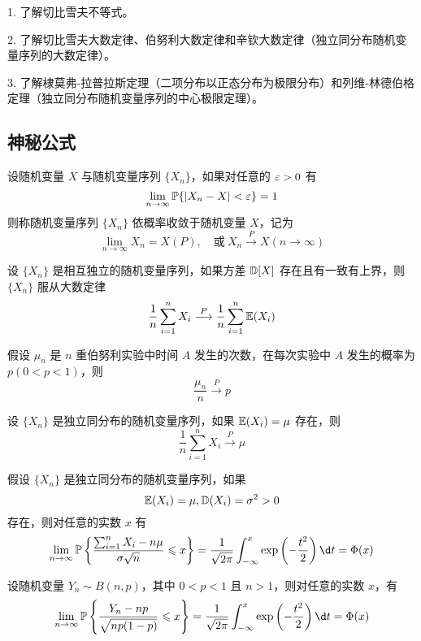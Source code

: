 1. 了解切比雪夫不等式。

2. 了解切比雪夫大数定律、伯努利大数定律和辛钦大数定律（独立同分布随机变量序列的大数定律）。

3. 了解棣莫弗-拉普拉斯定理（二项分布以正态分布为极限分布）和列维-林德伯格定理（独立同分布随机变量序列的中心极限定理）。

\subsection{神秘公式}

设随机变量 $X$ 与随机变量序列 $\{X_n\}$，如果对任意的 $\varepsilon > 0$ 有
\[ \lim_{n \to \infty} \mathbb{P}\{|X_n - X| < \varepsilon \} =1 \]
则称随机变量序列 $\{X_n\}$ 依概率收敛于随机变量 $X$，记为
\[ \lim_{n \to \infty} X_n = X(P), \quad \text{或}\ X_n \stackrel{P}{\longrightarrow} X(n \to \infty) \]

\begin{theorem}[切比雪夫大数定律]
	设 $\{X_n\}$ 是相互独立的随机变量序列，如果方差 $\mathbb{D} [X]$ 存在且有一致有上界，则 $\{X_n\}$ 服从大数定律
	\[ \frac{1}{n} \sum_{i=1}^n X_i \stackrel{P}{\longrightarrow} \frac{1}{n} \sum_{i=1}^n \mathbb{E}(X_i) \]
\end{theorem}

\begin{theorem}[伯努利大数定律]
	假设 $\mu_n$ 是 $n$ 重伯努利实验中时间 $A$ 发生的次数，在每次实验中 $A$ 发生的概率为 $p(0 < p < 1)$，则
	\[ \frac{\mu_n}{n} \stackrel{P}{\longrightarrow} p \]
\end{theorem}

\begin{theorem}[辛钦大数定律]
	设 $\{X_n\}$ 是独立同分布的随机变量序列，如果 $\mathbb{E}(X_i) = \mu$ 存在，则
	\[ \frac{1}{n} \sum_{i=1}^n X_i \stackrel{P}{\longrightarrow} \mu \]
\end{theorem}

\begin{theorem}[列维 - 林德伯格定理]
	假设 $\{X_n\}$ 是独立同分布的随机变量序列，如果
	\[ \mathbb{E}(X_i) = \mu, \mathbb{D}(X_i) = \sigma^2 > 0 \]
	存在，则对任意的实数 $x$ 有
	\[ \lim_{n \to \infty} \bbP\left\{ \frac{\sum_{i=1}^n X_i - n \mu}{\sigma \sqrt{n}} \leqslant x \right\} = \frac{1}{\sqrt{2 \pi}} \int_{-\infty}^x \exp\left(-\frac{t^2}{2}\right) \d t = \Phi(x)  \]
\end{theorem}

\begin{theorem}
	设随机变量 $Y_n \sim B(n, p)$，其中 $0 < p < 1$ 且 $n > 1$，则对任意的实数 $x$，有
	\[ \lim_{n \to \infty} \bbP\left\{ \frac{Y_n - np}{\sqrt{np(1 - p)}} \leqslant x \right\} = \frac{1}{\sqrt{2 \pi}} \int_{-\infty}^x \exp\left(-\frac{t^2}{2}\right) \d t = \Phi(x)  \]
\end{theorem}


